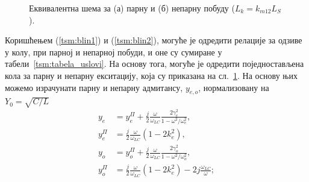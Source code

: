 \documentclass[main.tex]{subfiles}
\begin{document}
\begin{figure}[!t]
\centering
{}
\hfil
{}
\caption{Еквивалентна шема за (а) парну и (б) непарну побуду ($L_k=k_{m12}L_S$).}
\label{tsm:sl4}
\end{figure}
Коришћењем (\ref{tsm:blin1}) и (\ref{tsm:blin2}), могуће је одредити релације за одзиве у колу, при парној и непарној побуди, и оне су сумиране у табели~\ref{tsm:tabela_uslovi}. На основу тога, могуће је одредити поједностављена кола за парну и непарну екситацију, која су приказана на сл.~\ref{tsm:sl4}. На основу њих можемо израчунати парну и непарну адмитансу, $y_{e,o}$, нормализовану на $Y_0=\sqrt{C/L}$
\begin{equation}
\begin{aligned}
y_e &= y_e^\Pi + \frac{j}{2}\frac{\omega}{\omega_{LC}}\frac{2\gamma_e^2}{1-\omega^2 / \omega_e^2}, \\
y_e^\Pi &= \frac{j}{2}\frac{\omega}{\omega_{LC}}\left(1 - 2 k_e^2\right), \\
y_o &=  y_o^\Pi + \frac{j}{2}\frac{\omega}{\omega_{LC}}\frac{2\gamma_o^2}{1-\omega^2 / \omega_o^2}, \\
y_o^\Pi &= \frac{j}{2}\frac{\omega}{\omega_{LC}}\left(1 - 2 k_e^2\right) - 2j\frac{\omega_{LC}}{\omega}
;
\end{aligned}
\label{tsm:eo}
\end{equation}
\end{document}
